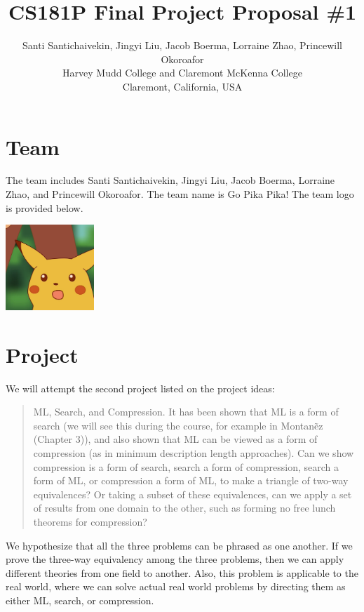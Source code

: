 \documentclass[12pt]{article}
\begin{document}
\title{CS181P Final Project Proposal \#1}

\author{
Santi Santichaivekin, Jingyi Liu, Jacob Boerma, Lorraine Zhao, Princewill Okoroafor\\
Harvey Mudd College and Claremont McKenna College\\
Claremont, California, USA\\
}

\maketitle

\section{Team}
The team includes Santi Santichaivekin,
Jingyi Liu,
Jacob Boerma,
Lorraine Zhao, and 
Princewill Okoroafor.
The team name is Go Pika Pika!
The team logo is provided below.

\includegraphics[width=0.25\textwidth]{Surprised_Pikachu_HD.jpg}

\section{Project}

We will attempt the second project listed on the project ideas:
\begin{quote}
ML, Search, and Compression. It has been shown that ML is a form of search (we will see this during the course, for example in Montan\~ez (Chapter 3)), and also shown that ML can be viewed as a form of compression (as in minimum description length approaches). Can we show compression is a form of search, search a form of compression, search a form of ML, or compression a form of ML, to make a triangle of two-way equivalences? Or taking a subset of these equivalences, can we apply a set of results from one domain to the other, such as forming no free lunch theorems for compression?
\end{quote}
We hypothesize that all the three problems can be phrased as one another. If we prove the three-way equivalency among the three problems, then we can apply different theories from one field to another.
Also, this problem is applicable to the real world, where we can solve actual real world problems by directing them as either ML, search, or compression. 
\end{document}
